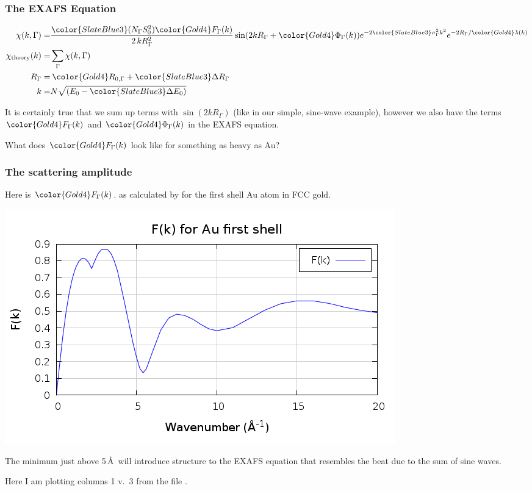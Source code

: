 \documentclass[10pt, xcolor=x11names, compress]{beamer}
\begin{document}
\begin{frame}
  \frametitle{The EXAFS Equation}
  {\small
    \begin{align}
      \chi(k,\Gamma) =&
      { \frac{{\color{SlateBlue3}(N_\Gamma S_0^2)}{\color{Gold4}F_\Gamma(k)}}
        {2\,kR_\Gamma^2} }
      \sin(2kR_\Gamma + {\color{Gold4}\Phi_\Gamma(k)})
      e^{-2{\color{SlateBlue3}\sigma_\Gamma^2}k^2}
      e^{-2R_\Gamma/{\color{Gold4}\lambda(k)}} \\
      \chi_{\mathrm{theory}}(k) =& \sum\limits_{\Gamma}\chi(k,\Gamma) \notag\\
      R_\Gamma =& \> {\color{Gold4}R_{0,\Gamma}} +
      {\color{SlateBlue3}\Delta R_\Gamma} \\
      k =& N\sqrt{(E_0 - {\color{SlateBlue3}\Delta E_0})}
    \end{align}}

  \medskip

  It is certainly true that we sum up terms with $\sin(2kR_\Gamma)$
  (like in our simple, sine-wave example), however we also have the
  terms ${\color{Gold4}F_\Gamma(k)}$ and
  ${\color{Gold4}\Phi_\Gamma(k)}$ in the EXAFS equation.

  \medskip

  \begin{block}{}
    \centering What does ${\color{Gold4}F_\Gamma(k)}$ look like for
    something as heavy as Au?
  \end{block}
\end{frame}

\begin{frame}
  \frametitle{The scattering amplitude}
  Here is ${\color{Gold4}F_\Gamma(k)}$. as calculated by {\feff} for
  the first shell Au atom in FCC gold.
  \begin{center}
    \includegraphics[width=0.7\linewidth]{f_au.png}
  \end{center}
  The minimum just above 5\,\AA\ will introduce structure to the EXAFS
  equation that resembles the beat due to the sum of sine waves.
  \begin{bottomnote}[0.7][19.5]%
    Here I am plotting columns 1 v.\ 3 from the file .
  \end{bottomnote}
\end{frame}
\end{document}
